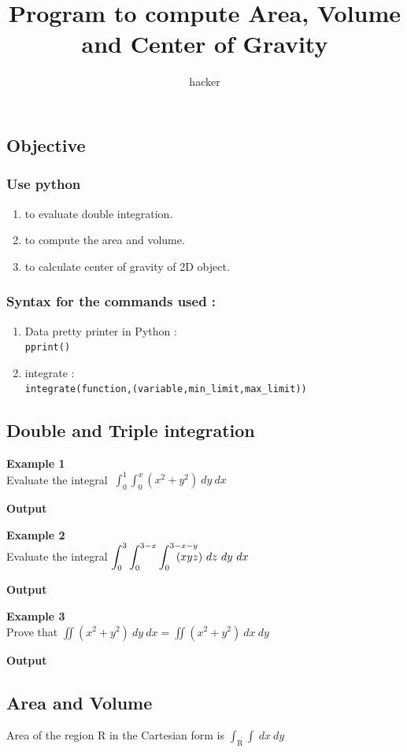 \documentclass{article}
\author{hacker}
\title{Program to compute Area, Volume and Center of Gravity}
\newcommand{\Iiint}[7]{\displaystyle\int_{#5}^{#6}\int_{#3}^{#4}\int_{#1}^{#2}#7}
\newcommand{\Iint}[5]{\displaystyle\int_{#3}^{#4}\int_{#1}^{#2}#5}
\newcommand{\dzyx}{~dz~dy~dx}
\newcommand{\dxy}{~dx~dy}
\newcommand{\dyx}{~dy~dx}
\newcommand{\example}[2]{
	\noindent \textbf{Example #1} \\
	#2
	
	
	\noindent \textbf{Output} \vspace{-1em}
	
}
\begin{document}
	\maketitle\thispagestyle{empty}
	
	\newpage
	\subsection*{Objective}
	\subsubsection*{Use python}
	\begin{enumerate}
		\item to evaluate double integration.
		\item to compute the area and volume.
		\item to calculate center of gravity of 2D object.
	\end{enumerate}
	
	\subsubsection*{Syntax for the commands used :}
	\begin{enumerate}
	\item Data pretty printer in Python : \\
		\texttt{pprint()}
	\item integrate : \\
		\texttt{integrate(function,(variable,min\_limit,max\_limit))}
	\end{enumerate}
	
	\subsection*{Double and Triple integration}
	\example{1}{
		Evaluate the integral $~\Iint{0}{x}{0}{1}{\left(x^2+y^2\right)\dyx}$
	} \vspace{2em}
	
	\example{2}{
		Evaluate the integral $\Iiint{0}{3-x-y}{0}{3-x}{0}{3}{\hspace{-2em}(xyz)\dzyx}$
	} \vspace{2em}
	
	\example{3}{
		Prove that $\displaystyle \iint\left(x^2+y^2\right)\dyx=\iint\left(x^2+y^2\right)\dxy$
	}
	
	\newpage
	
	\subsection*{Area and Volume}
	Area of the region R in the Cartesian form is $\displaystyle\int_{\text{R}}\int\dxy$
	\vspace{1em}
	
\end{document}
